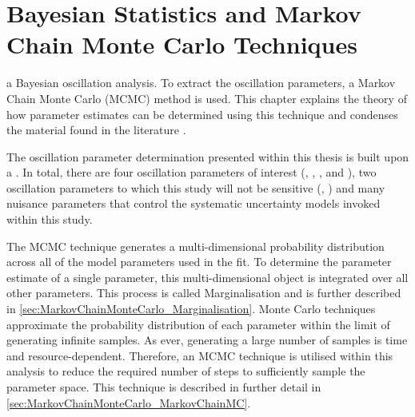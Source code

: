 \chapter{Bayesian Statistics and Markov Chain Monte Carlo Techniques}
\label{chap:MarkovChainMonteCarlo}
  a Bayesian oscillation analysis. To extract the oscillation parameters, a Markov Chain Monte Carlo (MCMC) method is used. This chapter explains the theory of how parameter estimates can be determined using this technique and condenses the material found in the literature \cite{mcmc_handbook, mcmc_practice, thesis_clarence, thesis_kirsty}.

The oscillation parameter determination presented within this thesis is built upon a  . In total, there are four oscillation parameters of interest (\sinsqatm, \sinsqreac, \delmsqatm, and \dcp), two oscillation parameters to which this study will not be sensitive (\sinsqsol, \delmsqsol) and  many nuisance parameters that control the systematic uncertainty models invoked within this study. 

The MCMC technique generates a multi-dimensional probability distribution across all of the model parameters used in the fit. To determine the parameter estimate of a single parameter, this multi-dimensional object is integrated over all other parameters. This process is called Marginalisation and is further described in \autoref{sec:MarkovChainMonteCarlo_Marginalisation}. Monte Carlo techniques approximate the probability distribution of each parameter within the limit of generating infinite samples. As ever, generating a large number of samples is time and resource-dependent. Therefore, an MCMC technique is utilised within this analysis to reduce the required number of steps to sufficiently sample the parameter space. This technique is described in further detail in \autoref{sec:MarkovChainMonteCarlo_MarkovChainMC}.

